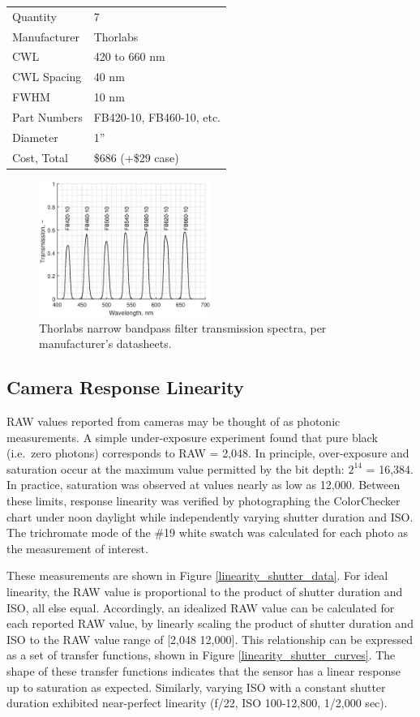 \documentclass[twocolumn,10pt]{asme2ej}
\newcommand{\id}{\hspace{6 mm}}
\begin{document}
\begin{tabular}{l | l}
Quantity & 7 \\
Manufacturer & Thorlabs \\
CWL & 420 to 660 nm \\
CWL Spacing & 40 nm \\
FWHM & 10 nm \\
Part Numbers & FB420-10, FB460-10, etc. \\
Diameter & 1'' \\
Cost, Total & \$686 (+\$29 case) \\
\end{tabular}

\begin{figure}
\centering
\includegraphics[width=0.5\textwidth]{thorlabs_filter_transmission_spectra.eps}
\caption{Thorlabs narrow bandpass filter transmission spectra, per manufacturer's datasheets. \cite{Thorlabs}}
\label{thorlabs_filter_transmission_spectra}
\end{figure}

\subsection{Camera Response Linearity}
\label{Camera Sensor Linearity}

RAW values reported from cameras may be thought of as photonic measurements. A simple under-exposure experiment found that pure black (i.e.\ zero photons) corresponds to RAW = 2,048. In principle, over-exposure and saturation occur at the maximum value permitted by the bit depth: $2^{14}$ = 16,384. In practice, saturation was observed at values nearly as low as 12,000. Between these limits, response linearity was verified by photographing the ColorChecker chart under noon daylight while independently varying shutter duration and ISO. The trichromate mode of the \#19 white swatch was calculated for each photo as the measurement of interest.

\id These measurements are shown in Figure \ref{linearity_shutter_data}. For ideal linearity, the RAW value is proportional to the product of shutter duration and ISO, all else equal. Accordingly, an idealized RAW value can be calculated for each reported RAW value, by linearly scaling the product of shutter duration and ISO to the RAW value range of [2,048 12,000]. This relationship can be expressed as a set of transfer functions, shown in Figure \ref{linearity_shutter_curves}. The shape of these transfer functions indicates that the sensor has a linear response up to saturation as expected. Similarly, varying ISO with a constant shutter duration exhibited near-perfect linearity (f/22, ISO 100-12,800, 1/2,000 sec).
\end{document}
